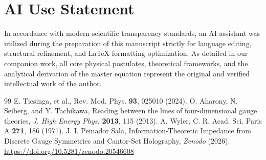 \documentclass[12pt,a4paper]{article}
\begin{document}
\section*{AI Use Statement}
In accordance with modern scientific transparency standards, an AI assistant was utilized during the preparation of this manuscript strictly for language editing, structural refinement, and LaTeX formatting optimization. As detailed in our companion work, all core physical postulates, theoretical frameworks, and the analytical derivation of the master equation represent the original and verified intellectual work of the author.


\begin{thebibliography}{99}
 E. Tiesinga, et al., Rev. Mod. Phys. \textbf{93}, 025010 (2024).
 O. Aharony, N. Seiberg, and Y. Tachikawa, Reading between the lines of four-dimensional gauge theories, \textit{J. High Energy Phys.} \textbf{2013}, 115 (2013).
 A. Wyler, C. R. Acad. Sci. Paris A \textbf{271}, 186 (1971).
 J. I. Peinador Sala, Information-Theoretic Impedance from Discrete Gauge Symmetries and Cantor-Set Holography, \textit{Zenodo} (2026). \url{https://doi.org/10.5281/zenodo.20546608}
\end{thebibliography}
\end{document}
